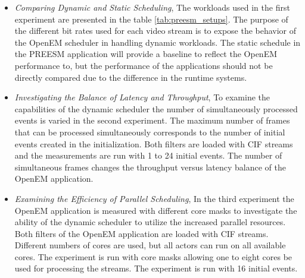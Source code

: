 \begin{itemize}
    \item \textit{Comparing Dynamic and Static Scheduling},
    The workloads used in the first experiment are presented in the table \ref{tab:preesm_setups}. The purpose of the different bit rates used for each video stream is to expose the behavior of the OpenEM scheduler in handling dynamic workloads. The static schedule in the PREESM application will provide a baseline to reflect the OpenEM performance to, but the performance of the applications should not be directly compared due to the difference in the runtime systems.

\item \textit{Investigating the Balance of Latency and Throughput},
To examine the capabilities of the dynamic scheduler the number of simultaneously processed events is varied in the second experiment. The maximum number of frames that can be processed simultaneously corresponds to the number of initial events created in the initialization. Both filters are loaded with CIF streams and the measurements are run with 1 to 24 initial events. The number of simultaneous frames changes the throughput versus latency balance of the OpenEM application.

\item \textit{Examining the Efficiency of Parallel Scheduling},
In the third experiment the OpenEM application is measured with different core masks to investigate the ability of the dynamic scheduler to utilize the increased parallel resources. Both filters of the OpenEM application are loaded with CIF streams. Different numbers of cores are used, but all actors can run on all available cores. The experiment is run with core masks allowing one to eight cores be used for processing the streams. The experiment is run with 16 initial events.
\end{itemize}
